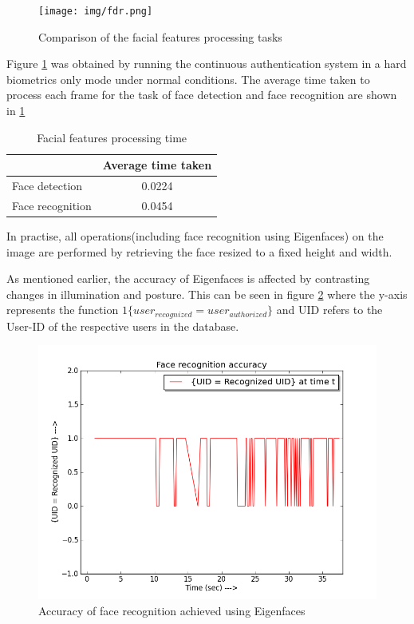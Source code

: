 \documentclass[%
        final,
        notitlepage,
        narroweqnarray,
        inline,
        ]{ieee}
\begin{document}
\begin{figure}[h!]
	\centering
	\texttt{[image: img/fdr.png]}
	\caption{Comparison of the facial features processing tasks}
	\label{fig:fdfr}
\end{figure}
Figure \ref{fig:fdfr} was obtained by running the continuous authentication system in a hard biometrics only mode under normal conditions. The average time taken to process each frame for the task of face detection and face recognition are shown in \ref{tab:fdr}

\begin{table}[htp]
	\centering
	\caption{Facial features processing time}
	\begin{tabular}{||l|c||} \hline \hline
			    &  Average time taken \\ \hline
	Face detection      &  0.0224             \\ \hline
	Face recognition    &  0.0454             \\ \hline \hline
	\end{tabular}
	\label{tab:fdr}
\end{table}
In practise, all operations(including face recognition using Eigenfaces) on the image are performed by retrieving the face resized to a fixed height and width.

As mentioned earlier, the accuracy of Eigenfaces is affected by contrasting changes in illumination and posture.
This can be seen in figure \ref{fig:fracc} where the y-axis represents the function $1\{user_{recognized}=user_{authorized}\}$ and UID refers to the User-ID of the respective users in the database.
\begin{figure}[h!]
	\centering
	\includegraphics[scale=0.40]{img/face_rec_accuracy.png}
	\caption{Accuracy of face recognition achieved using Eigenfaces}
	\label{fig:fracc}
\end{figure}
\end{document}
